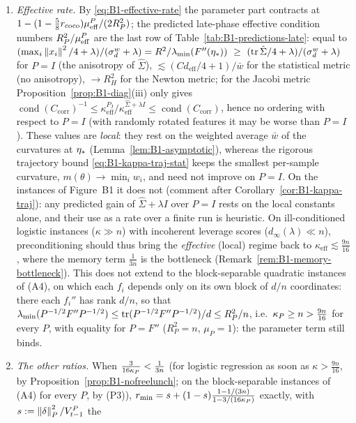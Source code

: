 \begin{enumerate}[label=(P\arabic*)]
\item \emph{Effective rate.} By \eqref{eq:B1-effective-rate} the parameter part contracts at
$1-(1-\frac58r_{\mathrm{coco}})\mu_{\mathrm{eff}}^P/(2R_P^2)$; the predicted late-phase effective condition numbers
$R_P^2/\mu_{\mathrm{eff}}^P$ are the last row of Table~\ref{tab:B1-predictions-late}: equal to
$(\max_i\norm{x_i}^2/4+\lambda)/(\sigma^w_d+\lambda)=R^2/\lmin(F''(\etastar))\ \ge\ (\tr\hat\Sigma/4+\lambda)/(\sigma^w_d+\lambda)$
for $P=I$ (the anisotropy of $\hat\Sigma$), $\lesssim(Cd_{\mathrm{eff}}/4+1)/\bar w$ for the statistical metric
(no anisotropy), $\to R_H^2$ for the Newton metric; for the Jacobi metric Proposition~\ref{prop:B1-diag}(iii)
only gives
$\operatorname{cond}(C_{\mathrm{corr}})^{-1}\le\kappa^{P_{\mathrm J}}_{\mathrm{eff}}/\kappa^{\hat\Sigma+\lambda I}_{\mathrm{eff}}\le\operatorname{cond}(C_{\mathrm{corr}})$,
hence no ordering with respect to $P=I$ (with randomly rotated features it may be worse than $P=I$). These
values are \emph{local}: they rest on the weighted average $\bar w$ of the curvatures at $\eta_\ast$
(Lemma~\ref{lem:B1-asymptotic}), whereas the rigorous trajectory bound \eqref{eq:B1-kappa-traj-stat} keeps the
smallest per-sample curvature, $m(\theta)\to\min_iw_i$, and need not improve on $P=I$. On the instances of
Figure~B1 it does not (comment after Corollary~\ref{cor:B1-kappa-traj}): any predicted gain of
$\hat\Sigma+\lambda I$ over $P=I$ rests on the local constants alone, and their use as a rate over a finite run
is heuristic. On ill-conditioned logistic instances ($\kappa\gg n$) with incoherent leverage scores
($d_\infty(\lambda)\ll n$), preconditioning should thus bring the \emph{effective} (local) regime back to
$\kappa_{\mathrm{eff}}\lesssim\frac{9n}{16}$, where the memory term $\frac1{3n}$ is the bottleneck
(Remark~\ref{rem:B1-memory-bottleneck}). This does not extend to the block-separable quadratic instances of
(A4), on which each $f_i$ depends only on its own block of $d/n$ coordinates: there each $f_i''$ has rank
$d/n$, so that $\lambda_{\min}(P^{-1/2}F''P^{-1/2})\le\operatorname{tr}(P^{-1/2}F''P^{-1/2})/d\le R_P^2/n$, i.e.\
$\kappa_P\ge n>\frac{9n}{16}$ for every $P$, with equality for $P=F''$ ($R_P^2=n$, $\mu_P=1$): the parameter
term still binds.
\item \emph{The other ratios.} When $\frac{3}{16\kappa_P}<\frac1{3n}$ (for logistic regression as soon as
$\kappa>\frac{9n}{16}$, by Proposition~\ref{prop:B1-nofreelunch}; on the block-separable instances of (A4) for
every $P$, by (P3)),
$r_{\mathrm{min}}=s+(1-s)\frac{1-1/(3n)}{1-3/(16\kappa_P)}$ exactly, with $s:=\left\|\delta\right\|_P^2/V_{t-1}^P$ the

\end{enumerate}
